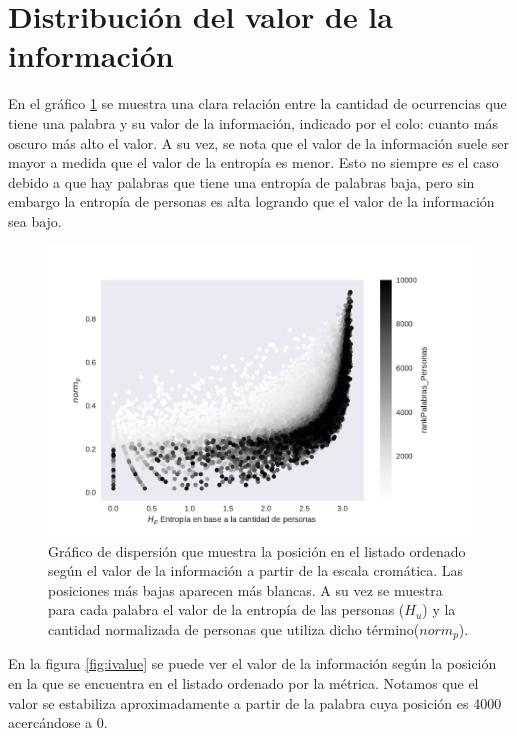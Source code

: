 \section{Distribución del valor de la información}
\label{sec:ValorDeLaInformacion}
En el gráfico \ref{fig:infoValue} se muestra una clara relación entre la cantidad de ocurrencias que tiene una palabra y su valor de la información, indicado por el colo: cuanto más oscuro más alto el valor. A su vez, se nota que el valor de la información suele ser mayor a medida que el valor de la entropía es menor. Esto no siempre es el caso debido a que hay palabras que tiene una entropía de palabras baja, pero sin embargo la entropía de personas es alta logrando que el valor de la información sea bajo.

\begin{figure}[ht]
\centering
\includegraphics[width=1.0\textwidth]{./images/entropiaPersonasxNormCantPersonas.pdf}
\caption{Gráfico de dispersión que muestra la posición en el listado ordenado según el valor de la información a partir de la escala cromática. Las posiciones más bajas aparecen más blancas. A su vez se muestra para cada palabra el valor de la entropía de las personas ($H_u$) y la cantidad normalizada de personas que utiliza dicho término($norm_p$). } 
\label{fig:infoValue} 
\end{figure}

En la figura \ref{fig:ivalue} se puede ver el valor de la información según la posición en la que se encuentra en el listado ordenado por la métrica. Notamos que el valor se estabiliza aproximadamente a partir de la palabra cuya posición es 4000 acercándose a 0.


